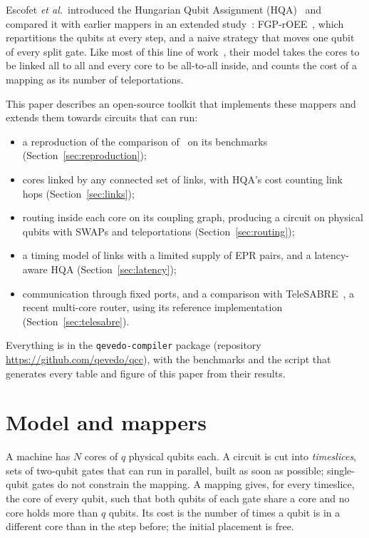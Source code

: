 \documentclass[11pt]{article}
\begin{document}
Escofet \emph{et al.}\ introduced the Hungarian Qubit Assignment
(HQA)~\cite{escofet2023hqa} and compared it with earlier mappers in an
extended study~\cite{escofet2025revisiting}: FGP-rOEE~\cite{baker2020timesliced},
which repartitions the qubits at every step, and a naive strategy that moves
one qubit of every split gate. Like most of this line of
work~\cite{ovide2023mapping}, their model takes the cores to be linked all to
all and every core to be all-to-all inside, and counts the cost of a mapping
as its number of teleportations.

This paper describes an open-source toolkit that implements these mappers and
extends them towards circuits that can run:

\begin{itemize}
\item a reproduction of the comparison of~\cite{escofet2025revisiting} on its
  benchmarks (Section~\ref{sec:reproduction});
\item cores linked by any connected set of links, with HQA's cost counting
  link hops (Section~\ref{sec:links});
\item routing inside each core on its coupling graph, producing a circuit on
  physical qubits with SWAPs and teleportations (Section~\ref{sec:routing});
\item a timing model of links with a limited supply of EPR pairs, and a
  latency-aware HQA (Section~\ref{sec:latency});
\item communication through fixed ports, and a comparison with
  TeleSABRE~\cite{russo2025telesabre}, a recent multi-core router, using its
  reference implementation (Section~\ref{sec:telesabre}).
\end{itemize}

Everything is in the \texttt{qevedo-compiler} package (repository
\url{https://github.com/qevedo/qcc}), with the benchmarks and the script
that generates every table and figure of this paper from their results.

\section{Model and mappers}
\label{sec:model}

A machine has $N$ cores of $q$ physical qubits each. A circuit is cut into
\emph{timeslices}, sets of two-qubit gates that can run in parallel, built as
soon as possible; single-qubit gates do not constrain the mapping. A mapping
gives, for every timeslice, the core of every qubit, such that both qubits of
each gate share a core and no core holds more than $q$ qubits. Its cost is
the number of times a qubit is in a different core than in the step before;
the initial placement is free.
\end{document}
